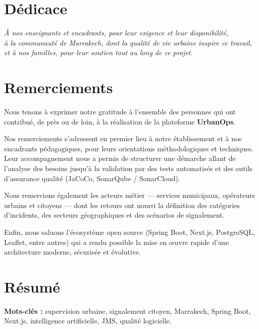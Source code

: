 \documentclass[12pt,a4paper,oneside]{report}
\begin{document}
\thispagestyle{empty}
\null
\newpage

\setcounter{page}{1}

\chapter*{\centering Dédicace}
\thispagestyle{empty}
\vspace*{2cm}
\begin{center}
  \large\itshape
  À nos enseignants et encadrants, pour leur exigence et leur disponibilité,\\[0.6em]
  à la communauté de Marrakech, dont la qualité de vie urbaine inspire ce travail,\\[0.6em]
  et à nos familles, pour leur soutien tout au long de ce projet.
\end{center}
\vfill
\newpage

\chapter*{Remerciements}
\normalsize
Nous tenons à exprimer notre gratitude à l'ensemble des personnes qui ont contribué, de près ou de loin, à la réalisation de la plateforme \textbf{UrbanOps}.

Nos remerciements s'adressent en premier lieu à notre établissement et à nos encadrants pédagogiques, pour leurs orientations méthodologiques et techniques. Leur accompagnement nous a permis de structurer une démarche allant de l'analyse des besoins jusqu'à la validation par des tests automatisés et des outils d'assurance qualité (JaCoCo, SonarQube / SonarCloud).

Nous remercions également les acteurs métier — services municipaux, opérateurs urbains et citoyens — dont les retours ont nourri la définition des catégories d'incidents, des secteurs géographiques et des scénarios de signalement.

Enfin, nous saluons l'écosystème open source (Spring Boot, Next.js, PostgreSQL, Leaflet, entre autres) qui a rendu possible la mise en œuvre rapide d'une architecture moderne, sécurisée et évolutive.

\newpage

\chapter*{Résumé}
\textbf{Mots-clés :} supervision urbaine, signalement citoyen, Marrakech, Spring Boot, Next.js, intelligence artificielle, JMS, qualité logicielle.
\end{document}
